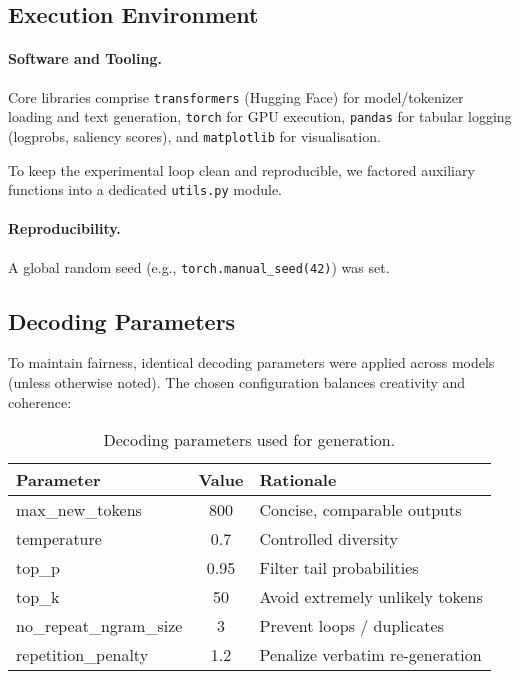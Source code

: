 \documentclass[12pt]{article}
\begin{document}

\subsection{Execution Environment}
\paragraph{Software and Tooling.}
Core libraries comprise \texttt{transformers} (Hugging Face) for model/tokenizer loading and text generation, \texttt{torch} for GPU execution, \texttt{pandas} for tabular logging (logprobs, saliency scores), and \texttt{matplotlib} for visualisation. 

To keep the experimental loop clean and reproducible, we factored auxiliary functions into a dedicated \texttt{utils.py} module.

\paragraph{Reproducibility.}
A global random seed (e.g., \texttt{torch.manual\_seed(42)}) was set. 

\subsection{Decoding Parameters}
To maintain fairness, identical decoding parameters were applied across models (unless otherwise noted). The chosen configuration balances creativity and coherence:

\begin{table}[h]
\centering
\caption{Decoding parameters used for generation.}
\label{tab:decoding}
\begin{tabular}{lcl}
\toprule
\textbf{Parameter} & \textbf{Value} & \textbf{Rationale} \\
\midrule
max\_new\_tokens        & 800   & Concise, comparable outputs \\
temperature             & 0.7   & Controlled diversity \\
top\_p                  & 0.95  & Filter tail probabilities \\
top\_k                  & 50    & Avoid extremely unlikely tokens \\
no\_repeat\_ngram\_size  & 3     & Prevent loops / duplicates \\
repetition\_penalty     & 1.2   & Penalize verbatim re-generation \\
\bottomrule
\end{tabular}
\end{table}
\end{document}
